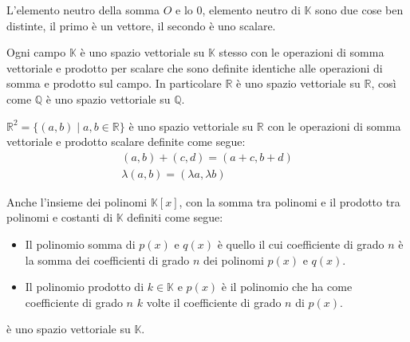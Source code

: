 \begin{observation}
	L'elemento neutro della somma $O$ e lo $0$, elemento neutro di $\mathbb{K}$
	sono due cose ben distinte, il primo è un vettore, il secondo è uno scalare.
\end{observation}

\begin{example}
	Ogni campo $\mathbb{K}$ \`e uno spazio vettoriale su $\mathbb{K}$
	stesso con le operazioni di somma vettoriale e prodotto per scalare
	che sono definite identiche alle operazioni di somma e prodotto sul
	campo. In particolare $\mathbb{R}$ \`e uno spazio vettoriale
	su $\mathbb{R}$, cos\`i come $\mathbb{Q}$ \`e uno spazio vettoriale
	su $\mathbb{Q}$.
\end{example}

\begin{example}
	$\mathbb{R}^2 = \{(a, b) \mid a,b \in \mathbb{R}\}$ \`e uno spazio
	vettoriale su $\mathbb{R}$ con le operazioni di somma vettoriale
	e prodotto scalare definite come segue:
	\begin{gather*}
		(a,b) + (c,d) = (a + c, b + d) \\
		\lambda (a, b) = (\lambda a, \lambda b)
	\end{gather*}
\end{example}

\begin{example}
	Anche l'insieme dei polinomi $\mathbb{K}[x]$, con la somma tra
	polinomi e il prodotto tra polinomi e costanti di $\mathbb{K}$
	definiti come segue:
	\begin{itemize}
		\item
		      Il polinomio somma di $p(x)$ e $q(x)$ \`e quello il cui
		      coefficiente di grado $n$ \`e la somma dei coefficienti di grado
		      $n$ dei polinomi $p(x)$ e $q(x)$.
		\item
		      Il polinomio prodotto di $k \in \mathbb{K}$ e $p(x)$ \`e il
		      polinomio che ha come coefficiente di grado $n$ $k$ volte il
		      coefficiente di grado $n$ di $p(x)$.
	\end{itemize}
	\`e uno spazio vettoriale su $\mathbb{K}$.
\end{example}